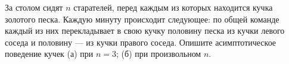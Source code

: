 \documentclass{article}
\begin{document}
За столом сидят $n$ старателей, перед каждым из которых находится кучка золотого песка. Каждую минуту происходит следующее:
по общей команде каждый из них перекладывает в свою кучку половину песка из кучки левого соседа и половину --- из кучки правого соседа. Опишите асимптотическое поведение кучек (а) при $n=3$; (б) при произвольном $n$.
\end{document}
